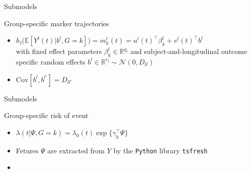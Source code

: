 \documentclass{beamer}
\newcommand{\E}{\mathbb E}
\newcommand{\R}{\mathbb R}
\newcommand{\cN}{\mathcal N}
\begin{document}
\begin{frame}{Submodels}

\small
\begin{block}{Group-specific marker trajectories}
\begin{itemize}
  \item<1-> \footnotesize $h_l\big(\E[Y^l(t)|b^l, G=k]\big) = m_k^l(t) = u^l(t)^\top\beta_k^l + v^l(t)^\top b^l$\\
  with fixed effect parameters $\beta_k^l \in \R^{q_l}$ and subject-and-longitudinal outcome specific random effects $b^l \in \R^{r_l} \sim \cN(0, D_{ll})$
  \item<2-> $\text{Cov}[b^l,b^{l'}] = D_{ll'}$

\end{itemize}
\end{block}

\end{frame}

\begin{frame}{Submodels}

\small
\begin{block}{Group-specific risk of event}
\begin{itemize}
  \item<1-> \footnotesize $\lambda(t|\Psi, G = k) = \lambda_0(t) \exp \big\{\gamma_k^\top \Psi \big\}$
  \item<2-> Fetures $\Psi$ are extracted from $Y$ by the \texttt{Python} library \texttt{tsfresh}
  \item<2-> \color{red}{TODO: Add descriptions}

\end{itemize}
\end{block}

\end{frame}
\end{document}
